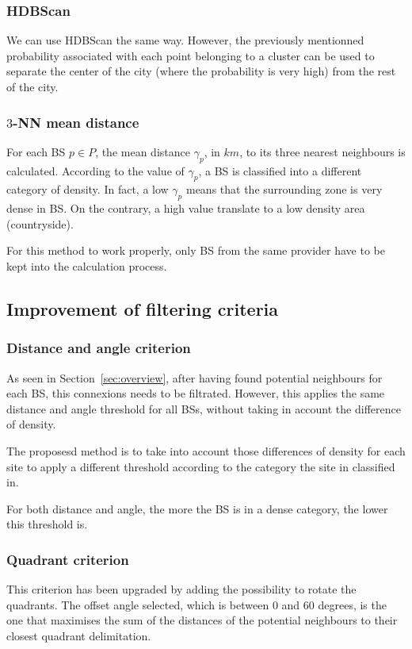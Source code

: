 \documentclass[lettersize,journal,english]{IEEEtran}
\begin{document}
        \subsubsection{HDBScan}
            We can use HDBScan the same way. However, the previously mentionned probability associated with each point belonging to a cluster can be used to separate the center of the city (where the probability is very high) from the rest of the city.

        \subsubsection{$3$-NN mean distance}
            For each BS $p\in P$, the mean distance $\gamma_p$, in $\unit{km}$, to its three nearest neighbours is calculated. According to the value of $\gamma_p$, a BS is classified into a different category of density. In fact, a low $\gamma_p$ means that the surrounding zone is very dense in BS. On the contrary, a high value translate to a low density area (countryside).

            For this method to work properly, only BS from the same provider have to be kept into the calculation process.

    \subsection{Improvement of filtering criteria}

        \subsubsection{Distance and angle criterion}
            As seen in Section~\ref{sec:overview}, after having found potential neighbours for each BS, this connexions needs to be filtrated. However, this applies the same distance and angle threshold for all BSs, without taking in account the difference of density.

            The proposesd method is to take into account those differences of density for each site to apply a different threshold according to the category the site in classified in.

            For both distance and angle, the more the BS is in a dense category, the lower this threshold is.

        \subsubsection{Quadrant criterion}
            This criterion has been upgraded by adding the possibility to rotate the quadrants. The offset angle selected, which is between $0$ and $60$ degrees, is the one that maximises the sum of the distances of the potential neighbours to their closest quadrant delimitation.
\end{document}
